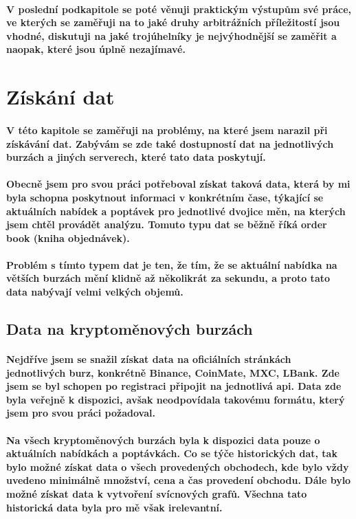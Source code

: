\documentclass[thesis=B,czech]{FITthesis}[2019/03/21]
\begin{document}
\paragraph{
V poslední podkapitole se poté věnuji praktickým výstupům své práce, ve kterých se zaměřuji na to jaké druhy arbitrážních příležitostí jsou vhodné, diskutuji na jaké trojúhelníky je nejvýhodnější se zaměřit a naopak, které jsou úplně nezajímavé.
}
\section{Získání dat}
\paragraph{
V této kapitole se zaměřuji na problémy, na které jsem narazil při získávání dat. Zabývám se zde také dostupností dat na jednotlivých burzách a jiných serverech, které tato data poskytují. 
}
\paragraph{
Obecně jsem pro svou práci potřeboval získat taková data, která by mi byla schopna poskytnout informaci v konkrétním čase, týkající se aktuálních nabídek a poptávek pro jednotlivé dvojice měn, na kterých jsem chtěl provádět analýzu. Tomuto typu dat se běžně říká order book (kniha objednávek).
}
\paragraph{
Problém s tímto typem dat je ten, že tím, že se aktuální nabídka na větších burzách mění klidně až několikrát za sekundu, a proto tato data nabývají velmi velkých objemů.
}
\subsection{Data na kryptoměnových burzách}
\paragraph{
Nejdříve jsem se snažil získat data na oficiálních stránkách jednotlivých burz, konkrétně Binance, CoinMate, MXC, LBank. Zde jsem se byl schopen po registraci připojit na jednotlivá api. Data zde byla veřejně k dispozici, avšak neodpovídala takovému formátu, který jsem pro svou práci požadoval. 
}
\paragraph{
Na všech kryptoměnových burzách byla k dispozici data pouze o aktuálních nabídkách a poptávkách. Co se týče historických dat, tak bylo možné získat data o všech provedených obchodech, kde bylo vždy uvedeno minimálně množství, cena a čas provedení obchodu. Dále bylo možné získat data k vytvoření svícnových grafů. Všechna tato historická data byla pro mě však irelevantní.
}
\end{document}
